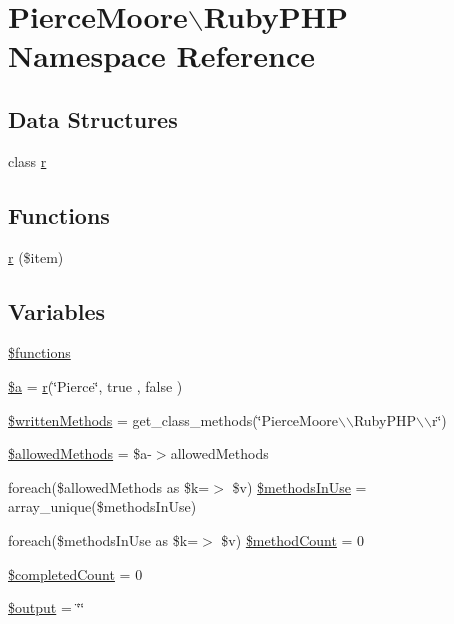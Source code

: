 \hypertarget{namespace_pierce_moore_1_1_ruby_p_h_p}{\section{Pierce\-Moore$\backslash$Ruby\-P\-H\-P Namespace Reference}
\label{namespace_pierce_moore_1_1_ruby_p_h_p}
}
\subsection*{Data Structures}
\begin{DoxyCompactItemize}
\item 
class \hyperlink{class_pierce_moore_1_1_ruby_p_h_p_1_1r}{r}
\end{DoxyCompactItemize}
\subsection*{Functions}
\begin{DoxyCompactItemize}
\item 
\hyperlink{namespace_pierce_moore_1_1_ruby_p_h_p_add70f208c72bf2a57bc4ff08438cfed8}{r} (\$item)
\end{DoxyCompactItemize}
\subsection*{Variables}
\begin{DoxyCompactItemize}
\item 
\hyperlink{namespace_pierce_moore_1_1_ruby_p_h_p_aa75daea491817f3b64daa2f51128bcdf}{\$functions}
\item 
\hyperlink{namespace_pierce_moore_1_1_ruby_p_h_p_acebf83966ef6d7e5645a6b62ba368f9f}{\$a} = \hyperlink{class_pierce_moore_1_1_ruby_p_h_p_1_1r}{r}(\char`\"{}Pierce\char`\"{}, true , false )
\item 
\hyperlink{namespace_pierce_moore_1_1_ruby_p_h_p_a2e64f0494f7eccf90168af7f67198650}{\$written\-Methods} = get\-\_\-class\-\_\-methods(\char`\"{}Pierce\-Moore$\backslash$$\backslash$\-Ruby\-P\-H\-P$\backslash$$\backslash$r\char`\"{})
\item 
\hyperlink{namespace_pierce_moore_1_1_ruby_p_h_p_ab278eba7cab5341dacdccecd7a2cc2df}{\$allowed\-Methods} = \$a-\/$>$allowed\-Methods
\item 
foreach(\$allowed\-Methods as \$k=$>$ \$v) \hyperlink{namespace_pierce_moore_1_1_ruby_p_h_p_a1c475c0c53206fb15c4c3028bb7d5c7c}{\$methods\-In\-Use} = array\-\_\-unique(\$methods\-In\-Use)
\item 
foreach(\$methods\-In\-Use as \$k=$>$ \$v) \hyperlink{namespace_pierce_moore_1_1_ruby_p_h_p_a56c1b7384519355df73a254a12f0bae3}{\$method\-Count} = 0
\item 
\hyperlink{namespace_pierce_moore_1_1_ruby_p_h_p_a51c734a41c7747051953ec3d78dd1c5b}{\$completed\-Count} = 0
\item 
\hyperlink{namespace_pierce_moore_1_1_ruby_p_h_p_a3b3e916294d02621688f0b1b64f95628}{\$output} = \char`\"{}\char`\"{}
\end{DoxyCompactItemize}


